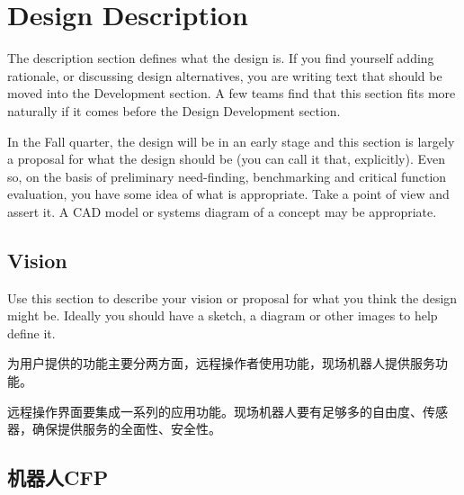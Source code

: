 \chapter{Design Description}
\label{design-description}

\begin{remark}\color{blue}
The description section defines what the design is. If you find yourself adding rationale, or discussing design alternatives, you are writing text that should be moved into the Development section. A few teams find that this section fits more naturally if it comes before the Design Development section.

In the Fall quarter, the design will be in an early stage and this section is largely a proposal for what the design should be (you can call it that, explicitly). Even so, on the basis of preliminary need-finding, benchmarking and critical function evaluation, you have some idea of what is appropriate. Take a point of view and assert it. A CAD model or systems diagram of a concept may be appropriate.
\normalcolor \end{remark}

\section{Vision}
\label{vision}

\begin{remark}\color{blue}
Use this section to describe your vision or proposal for what you think the design might be. Ideally you should have a sketch, a diagram or other images to help define it.
\normalcolor
\end{remark}


为用户提供的功能主要分两方面，远程操作者使用功能，现场机器人提供服务功能。

远程操作界面要集成一系列的应用功能。现场机器人要有足够多的自由度、传感器，确保提供服务的全面性、安全性。

\section{机器人CFP}


